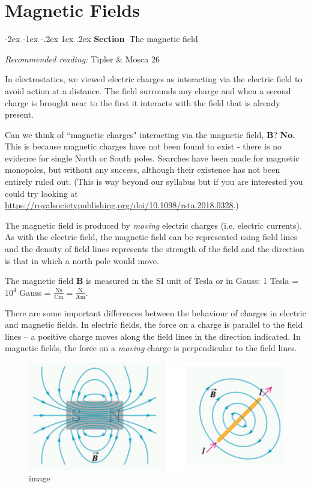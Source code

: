 \documentclass[
]{book}
\makeatletter
\renewcommand\section{%
\@startsection{section}{1}{\z@}%
              {-2ex \@plus -1ex \@minus -.2ex}%
              {1ex \@plus .2ex}%
              {\sffamily\bfseries\large\noindent Section~}}
\numberwithin{equation}{section}
\makeatother
\begin{document}
\hypertarget{magnetic-fields}{%
\chapter{Magnetic Fields}\label{magnetic-fields}}

\hypertarget{the-magnetic-field}{%
\section{The magnetic field}\label{the-magnetic-field}}

\emph{Recommended reading:} Tipler \& Mosca 26

In electrostatics, we viewed electric charges as interacting via the
electric field to avoid action at a distance. The field surrounds any
charge and when a second charge is brought near to the first it
interacts with the field that is already present.

Can we think of ``magnetic charges" interacting via the magnetic field,
\(\mathbf{B}\)? \textbf{No.} This is because magnetic charges have not been found to
exist - there is no evidence for single North or South poles. Searches
have been made for magnetic monopoles, but without any success, although
their existence has not been entirely ruled out. (This is way beyond our
syllabus but if you are interested you could try looking at
\url{https://royalsocietypublishing.org/doi/10.1098/rsta.2018.0328}.)

The magnetic field is produced by \emph{moving} electric charges (i.e.
electric currents). As with the electric field, the magnetic field can
be represented using field lines and the density of field lines
represents the strength of the field and the direction is that in which
a north pole would move.

The magnetic field \(\mathbf{B}\) is measured in the SI unit of Tesla or in Gauss:
1 Tesla = \(10^4\) Gauss =
\(\frac{\mathrm{Ns}}{\mathrm{Cm}} = \frac{\mathrm{N}}{\mathrm{Am}}\).

There are some important differences between the behaviour of charges in
electric and magnetic fields. In electric fields, the force on a charge
is parallel to the field lines -- a positive charge moves along the
field lines in the direction indicated. In magnetic fields, the force on
a \emph{moving} charge is perpendicular to the field lines.

\begin{figure}
\centering
\includegraphics[width=120mm,height=\textheight]{Figures/MagFields.png}
\caption{image}
\end{figure}
\end{document}

